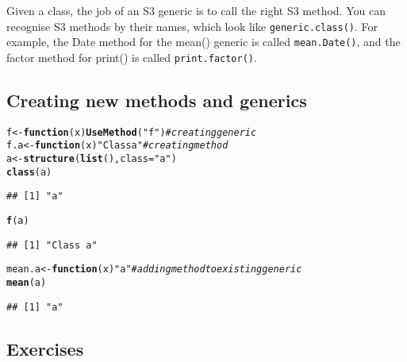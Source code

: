 \documentclass{article}\usepackage[]{graphicx}\usepackage[]{color}
\makeatletter
\newcommand{\hlstr}[1]{\textcolor[rgb]{0.192,0.494,0.8}{#1}}%
\newcommand{\hlcom}[1]{\textcolor[rgb]{0.678,0.584,0.686}{\textit{#1}}}%
\newcommand{\hlstd}[1]{\textcolor[rgb]{0.345,0.345,0.345}{#1}}%
\newcommand{\hlkwa}[1]{\textcolor[rgb]{0.161,0.373,0.58}{\textbf{#1}}}%
\newcommand{\hlkwb}[1]{\textcolor[rgb]{0.69,0.353,0.396}{#1}}%
\newcommand{\hlkwc}[1]{\textcolor[rgb]{0.333,0.667,0.333}{#1}}%
\newcommand{\hlkwd}[1]{\textcolor[rgb]{0.737,0.353,0.396}{\textbf{#1}}}%
\newenvironment{kframe}{%
 \def\at@end@of@kframe{}%
 \ifinner\ifhmode%
  \def\at@end@of@kframe{\end{minipage}}%
  \begin{minipage}{\columnwidth}%
 \fi\fi%
 \def\FrameCommand##1{\hskip\@totalleftmargin \hskip-\fboxsep
 \colorbox{shadecolor}{##1}\hskip-\fboxsep
     \hskip-\linewidth \hskip-\@totalleftmargin \hskip\columnwidth}%
 \MakeFramed {\advance\hsize-\width
   \@totalleftmargin\z@ \linewidth\hsize
   \@setminipage}}%
 {\par\unskip\endMakeFramed%
 \at@end@of@kframe}
\newenvironment{knitrout}{}{} %
\makeatother
\begin{document}
Given a class, the job of an S3 generic is to call the right S3 method. You can recognise S3 methods by their names, which look like \verb`generic.class()`. For example, the Date method for the mean() generic is called \verb`mean.Date()`, and the factor method for print() is called \verb`print.factor()`. 

\subsection{Creating new methods and generics}

\begin{knitrout}
\color{fgcolor}\begin{kframe}
\begin{alltt}
\hlstd{f} \hlkwb{<-} \hlkwa{function}\hlstd{(}\hlkwc{x}\hlstd{)} \hlkwd{UseMethod}\hlstd{(}\hlstr{"f"}\hlstd{)} \hlcom{# creating generic}
\hlstd{f.a} \hlkwb{<-} \hlkwa{function}\hlstd{(}\hlkwc{x}\hlstd{)} \hlstr{"Class a"} \hlcom{# creating method}
\hlstd{a} \hlkwb{<-} \hlkwd{structure}\hlstd{(}\hlkwd{list}\hlstd{(),} \hlkwc{class}\hlstd{=}\hlstr{"a"}\hlstd{)}
\hlkwd{class}\hlstd{(a)}
\end{alltt}
\begin{verbatim}
## [1] "a"
\end{verbatim}
\begin{alltt}
\hlkwd{f}\hlstd{(a)}
\end{alltt}
\begin{verbatim}
## [1] "Class a"
\end{verbatim}
\begin{alltt}
\hlstd{mean.a} \hlkwb{<-} \hlkwa{function}\hlstd{(}\hlkwc{x}\hlstd{)} \hlstr{"a"} \hlcom{# adding method to existing generic}
\hlkwd{mean}\hlstd{(a)}
\end{alltt}
\begin{verbatim}
## [1] "a"
\end{verbatim}
\end{kframe}
\end{knitrout}

\subsection{Exercises}
\end{document}
